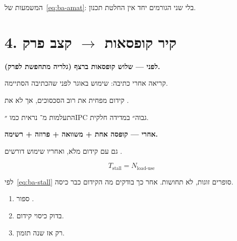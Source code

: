 המשמעות של~\eqref{eq:ba-amat}: בלי שני הגורמים יחד אין החלטת תכנון.

\clearpage
\section*{4. קיר קופסאות $\rightarrow$ קצב פרק}

\noindent\textbf{לפני — שלוש קופסאות ברצף (גלריה מתחפשת לפרק).}

\begin{defbox}[frametitle={הגדרה — \en{RAW}}]
קריאה אחרי כתיבה: שימוש באוגר לפני שהכתיבה הסתיימה.
\end{defbox}
\begin{keybox}[frametitle={רעיון מפתח}]
קידום מפחית את רוב הסכסוכים, אך לא את .
\end{keybox}
\begin{warnbox}[frametitle={מלכודת}]
התעלמות מ־ נראית כמו ״IPC גבוה״ במדידה חלקית.
\end{warnbox}

\vspace{0.8em}
\noindent\textbf{אחרי — קופסה אחת + משוואה + פרוזה + רשימה.}
\begin{warnbox}[frametitle={מלכודת — \en{load-use}}]
גם עם קידום מלא,  ואחריו שימוש דורשים .
\end{warnbox}

\begin{equation}
\label{eq:ba-stall}
T_{\mathrm{stall}}=N_{\mathrm{load\text{-}use}}
\end{equation}

לפי~\eqref{eq:ba-stall} סופרים זוגות, לא תחושות. אחר כך בודקים מה הקידום כבר כיסה.

\begin{enumerate}\itemsep2pt
\item[(\textbf{א})] ספור .
\item[(\textbf{ב})] בדוק כיסוי קידום.
\item[(\textbf{ג})] רק אז שנה תזמון.
\end{enumerate}

\vspace{1em}
\begin{center}
\end{center}


